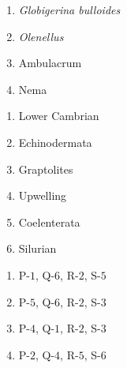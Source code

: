 \documentclass[12pt,fleqn]{article}
\theoremstyle{remark}
\begin{document}
\begin{enumerate}[label=Q.\arabic*.]
\begin{multicols}{2}
            \begin{enumerate}[label=(\Alph*),start=16]
                \item \textit{Globigerina bulloides}
                \item \textit{Olenellus}
                \item Ambulacrum
                \item Nema
            \end{enumerate}
            \columnbreak
            
            \begin{enumerate}[label=\arabic*.]
                \item Lower Cambrian
                \item Echinodermata
                \item Graptolites
                \item Upwelling
                \item Coelenterata
                \item Silurian
            \end{enumerate}
            

        \end{multicols}
            \begin {enumerate}
                
                    \item P-$1$, Q-$6$, R-$2$, S-$5$
                    \item P-$5$, Q-$6$, R-$2$, S-$3$
                    \item P-$4$, Q-$1$, R-$2$, S-$3$
                    \item P-$2$, Q-$4$, R-$5$, S-$6$
                

\end{enumerate}
\end{enumerate}
\end{document}
